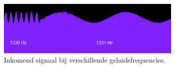 \documentclass[a4paper,10pt]{article}
\begin{document}
\begin{figure}[ht!]
    \centering
    \includegraphics[width=0.8\textwidth]{resonance_2_frequencies_commit_ff82f.png}
    \caption{Inkomend signaal bij verschillende geluidsfrequencies.}
    \label{fig:resonance}
\end{figure}

% 



\end{document}
